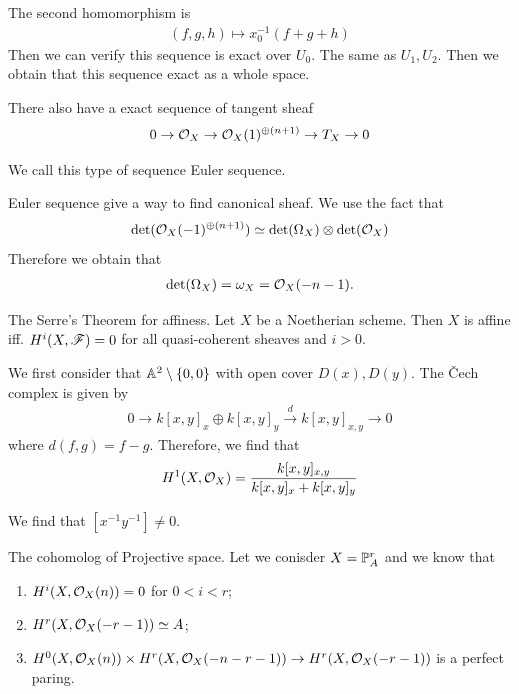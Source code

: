 {The second homomorphism is 
\begin{align*}
    (f,g,h)\mapsto  x_0^{-1}(f+g+h)
\end{align*}
Then we can verify this sequence is exact over $U_0$. The same as $U_1,U_2$. Then we obtain that this sequence exact as a whole space.

There also have a exact sequence of tangent sheaf 
\begin{align*}
    0\to \o_X\to \o_X(1)^{\oplus (n+1)} \to T_{X} \to 0
\end{align*}

We call this type of sequence Euler sequence. 

\np Euler sequence give a way to find canonical sheaf. We use the fact that 
\begin{align*}
    \det(\o_X(-1)^{\oplus(n+1)}) \simeq \det(\Omega_X)\otimes \det(\o_X)
\end{align*}
Therefore we obtain that 
\begin{align*}
    \det(\Omega_X)=\omega_X = \o_X(-n-1).
\end{align*}

\np 


\np The Serre's Theorem for affiness. Let $X$ be a Noetherian scheme. Then $X$ is affine iff. $H^i(X,\f)=0$ for all quasi-coherent sheaves and $i>0$.

We first consider that $\A^2\setminus \{0,0\}$ with open cover $D(x),D(y)$.
The Čech complex is given by 
\begin{align*}
    0 \to k[x,y]_x \oplus k[x,y]_y \xrightarrow{d} k[x,y]_{x,y} \to 0 
\end{align*}
where $d(f,g) = f-g$. Therefore, we find that 
\begin{align*}
    H^1(X,\o_X) = \frac{k[x,y]_{x,y}}{ k[x,y]_x + k[x,y]_y}
\end{align*}

We find that $[x^{-1}y^{-1}]\neq 0$.

\np The cohomolog of Projective space. Let we conisder $X=\P_A^r$
and we know that 
\begin{enumerate}
    \item $H^{i}(X,\o_X(n))=0$ for $0<i<r$;
    \item $H^r(X,\o_X(-r-1))\simeq A$;
    \item $H^0(X,\o_X(n))\times H^r(X,\o_X(-n-r-1))\to H^r(X,\o_X(-r-1))$ is a perfect paring.
\end{enumerate}

}
